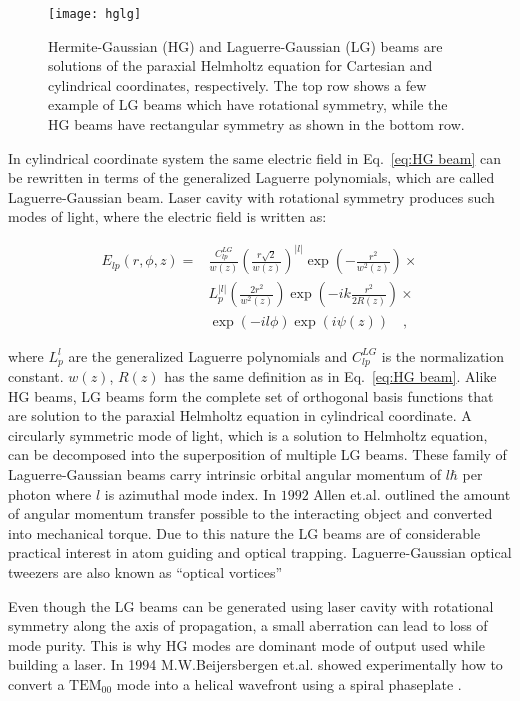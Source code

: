 \begin{figure}[t!]
  \centering
  \texttt{[image: hglg]}
  \caption{Hermite-Gaussian (HG) and Laguerre-Gaussian (LG) beams are solutions of the paraxial Helmholtz equation for Cartesian and cylindrical coordinates, respectively. The top row shows a few example of LG beams which have rotational symmetry, while the HG beams have rectangular symmetry as shown in the bottom row.}
  \label{fig:hglg}
\end{figure}


In cylindrical coordinate system the same electric field in Eq.~\eqref{eq:HG beam} can be rewritten in terms of the generalized Laguerre polynomials, which are called Laguerre-Gaussian beam. Laser cavity with rotational symmetry produces such modes of light, where the electric field is written as:

\begin{equation}
\label{eq: LG Beam}
\begin{split}
E_{lp}(r,\phi, z) = & \frac{C^{LG}_{lp}}{w(z)}\left(\frac{r\sqrt{2}}{w(z)}\right) ^{|l|}\exp \left(-\frac{r^2}{w^2 (z)}\right) \times \\
							& L^{|l|}_{p}\left(\frac{2r^2}{w^2(z)}\right) \exp \left( -ik\frac{r^2}{2R(z)}\right) \times \\
							& \exp (-il\phi) \exp (i\psi(z)) \quad ,
\end{split}
\end{equation}

where $L^{l}_{p}$ are the generalized Laguerre polynomials and $C^{LG}_{lp}$ is the normalization constant. $w(z)$, $R(z)$ has the same definition as in Eq.~\eqref{eq:HG beam}. Alike HG beams, LG beams form the complete set of orthogonal basis functions that are solution to the paraxial Helmholtz equation in cylindrical coordinate. A circularly symmetric mode of light, which is a solution to Helmholtz equation, can be decomposed into the superposition of multiple LG beams. These family of Laguerre-Gaussian beams carry intrinsic orbital angular momentum of $l\hbar$ per photon \cite{allen1992} where $l$ is azimuthal mode index. In $\mathrm{1992}$ Allen et.al. outlined the amount of angular momentum transfer possible to the interacting object and converted into mechanical torque. Due to this nature the LG beams are of considerable practical interest in atom guiding and optical trapping. Laguerre-Gaussian optical tweezers are also known as ``optical vortices'' 

Even though the LG beams can be generated using laser cavity with rotational symmetry along the axis of propagation, a small aberration can lead to loss of mode purity. This is why HG modes are dominant mode of output used while building a laser. In 1994 M.W.Beijersbergen et.al. \cite{BEIJERSBERGEN1994321} showed experimentally how to convert a $\mathrm{TEM}_{00}$ mode into a helical wavefront using a spiral phaseplate \cite{Ruffato:14}.


